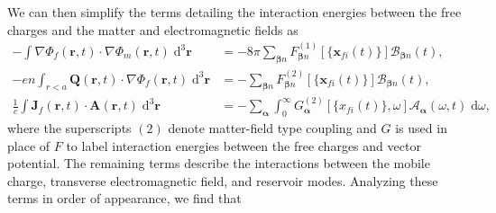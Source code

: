 \documentclass{article}
\begin{document}
We can then simplify the terms detailing the interaction energies between the free charges and the matter and electromagnetic fields as
\begin{equation}
\begin{split}
-\int\nabla\Phi_f(\mathbf{r},t)\cdot\nabla\Phi_m(\mathbf{r},t)\;\mathrm{d}^3\mathbf{r} &= -8\pi\sum_{\bm{\beta}n}F_{\bm{\beta}n}^{(1)}[\{\mathbf{x}_{fi}(t)\}]\mathcal{B}_{\bm{\beta}n}(t),\\
-en\int_{r<a}\mathbf{Q}(\mathbf{r},t)\cdot\nabla\Phi_f(\mathbf{r},t)\;\mathrm{d}^3\mathbf{r} &= -\sum_{\bm{\beta}n}F_{\bm{\beta}n}^{(2)}[\{\mathbf{x}_{fi}(t)\}]\mathcal{B}_{\bm{\beta}n}(t),\\
\frac{1}{c}\int\mathbf{J}_f(\mathbf{r},t)\cdot\mathbf{A}(\mathbf{r},t)\;\mathrm{d}^3\mathbf{r} &= -\sum_{\bm{\alpha}}\int_0^\infty G_{\bm{\alpha}}^{(2)}[\{x_{fi}(t)\},\omega]\mathcal{A}_{\bm{\alpha}}(\omega,t)\;\mathrm{d}\omega,
\end{split}
\end{equation}
where the superscripts $(2)$ denote matter-field type coupling and $G$ is used in place of $F$ to label interaction energies between the free charges and vector potential. The remaining terms describe the interactions between the mobile charge, transverse electromagnetic field, and reservoir modes. Analyzing these terms in order of appearance, we find that
\end{document}
